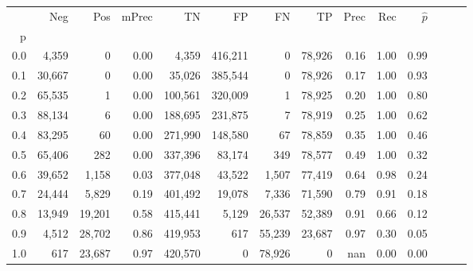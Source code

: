 \begin{tabular}{rrrrrrrrrrrrrr}
\toprule
{} &     Neg &     Pos & mPrec &       TN &       FP &      FN &      TP &  Prec &   Rec & $\hat{p}$ \\
p   &         &         &       &          &          &         &         &       &       &           \\
\midrule
0.0 &   4,359 &       0 &  0.00 &    4,359 &  416,211 &       0 &  78,926 &  0.16 &  1.00 &      0.99 \\
0.1 &  30,667 &       0 &  0.00 &   35,026 &  385,544 &       0 &  78,926 &  0.17 &  1.00 &      0.93 \\
0.2 &  65,535 &       1 &  0.00 &  100,561 &  320,009 &       1 &  78,925 &  0.20 &  1.00 &      0.80 \\
0.3 &  88,134 &       6 &  0.00 &  188,695 &  231,875 &       7 &  78,919 &  0.25 &  1.00 &      0.62 \\
0.4 &  83,295 &      60 &  0.00 &  271,990 &  148,580 &      67 &  78,859 &  0.35 &  1.00 &      0.46 \\
0.5 &  65,406 &     282 &  0.00 &  337,396 &   83,174 &     349 &  78,577 &  0.49 &  1.00 &      0.32 \\
0.6 &  39,652 &   1,158 &  0.03 &  377,048 &   43,522 &   1,507 &  77,419 &  0.64 &  0.98 &      0.24 \\
0.7 &  24,444 &   5,829 &  0.19 &  401,492 &   19,078 &   7,336 &  71,590 &  0.79 &  0.91 &      0.18 \\
0.8 &  13,949 &  19,201 &  0.58 &  415,441 &    5,129 &  26,537 &  52,389 &  0.91 &  0.66 &      0.12 \\
0.9 &   4,512 &  28,702 &  0.86 &  419,953 &      617 &  55,239 &  23,687 &  0.97 &  0.30 &      0.05 \\
1.0 &     617 &  23,687 &  0.97 &  420,570 &        0 &  78,926 &       0 &   nan &  0.00 &      0.00 \\
\bottomrule
\end{tabular}
